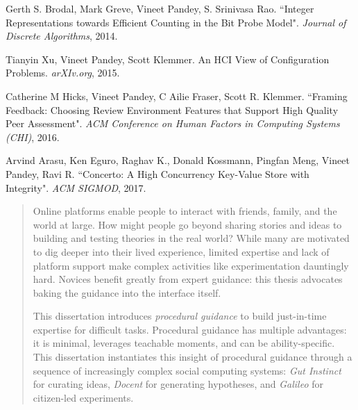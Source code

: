\begin{frontmatter}
\begin{vitapage}
\begin{publications}
\item Gerth S. Brodal, Mark Greve, Vineet Pandey, S. Srinivasa Rao. ``Integer Representations towards Efficient Counting in the Bit Probe Model". \emph{Journal of Discrete Algorithms}, 2014.
\item Tianyin Xu, Vineet Pandey, Scott Klemmer. An HCI View of Configuration Problems. \emph{arXIv.org}, 2015. 
\item Catherine M Hicks, Vineet Pandey, C Ailie Fraser, Scott R. Klemmer. ``Framing Feedback: Choosing Review Environment Features that Support High Quality Peer Assessment". \emph{ACM Conference on Human Factors in Computing Systems (CHI)},  2016. 
\item Arvind Arasu, Ken Eguro, Raghav K., Donald Kossmann, Pingfan Meng, Vineet Pandey, Ravi R. ``Concerto: A High Concurrency Key-Value Store with Integrity". \emph{ACM SIGMOD}, 2017.

\end{publications}
\end{vitapage}


%
%
\begin{abstract}
Online platforms enable people to interact with friends, family, and the world at large. How might people go beyond sharing stories and ideas to building and testing theories in the real world? While many are motivated to dig deeper into their lived experience, limited expertise and lack of platform support make complex activities like experimentation dauntingly hard. Novices benefit greatly from expert guidance: this thesis advocates baking the guidance into the interface itself.

This dissertation introduces \textit{procedural guidance} to build just-in-time expertise for difficult tasks. Procedural guidance has multiple advantages: it is minimal, leverages teachable moments, and can be ability-specific. This dissertation instantiates this insight of procedural guidance through a sequence of increasingly complex social computing systems: \textit{Gut Instinct} for curating ideas,  \textit{Docent} for generating hypotheses, and \textit{Galileo} for citizen-led experiments.


\end{abstract}
\end{frontmatter}
